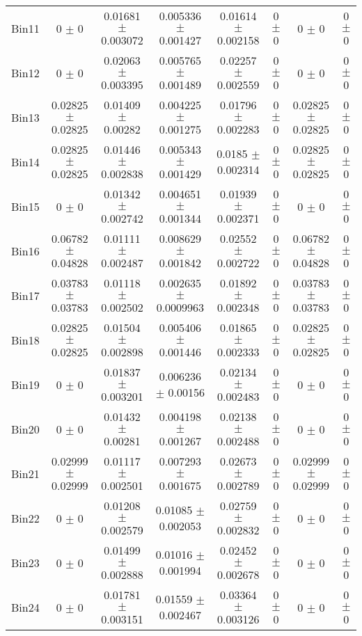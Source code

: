 \begin{tabular}{@{\extracolsep{4pt}}lccccccc@{}}
     Bin11 & 0 $\pm$ 0 & 0.01681 $\pm$ 0.003072 & 0.005336 $\pm$ 0.001427 & 0.01614 $\pm$ 0.002158 & 0 $\pm$ 0 & 0 $\pm$ 0 & 0 $\pm$ 0 \\ 
     Bin12 & 0 $\pm$ 0 & 0.02063 $\pm$ 0.003395 & 0.005765 $\pm$ 0.001489 & 0.02257 $\pm$ 0.002559 & 0 $\pm$ 0 & 0 $\pm$ 0 & 0 $\pm$ 0 \\ 
     Bin13 & 0.02825 $\pm$ 0.02825 & 0.01409 $\pm$ 0.00282 & 0.004225 $\pm$ 0.001275 & 0.01796 $\pm$ 0.002283 & 0 $\pm$ 0 & 0.02825 $\pm$ 0.02825 & 0 $\pm$ 0 \\ 
     Bin14 & 0.02825 $\pm$ 0.02825 & 0.01446 $\pm$ 0.002838 & 0.005343 $\pm$ 0.001429 & 0.0185 $\pm$ 0.002314 & 0 $\pm$ 0 & 0.02825 $\pm$ 0.02825 & 0 $\pm$ 0 \\ 
     Bin15 & 0 $\pm$ 0 & 0.01342 $\pm$ 0.002742 & 0.004651 $\pm$ 0.001344 & 0.01939 $\pm$ 0.002371 & 0 $\pm$ 0 & 0 $\pm$ 0 & 0 $\pm$ 0 \\ 
     Bin16 & 0.06782 $\pm$ 0.04828 & 0.01111 $\pm$ 0.002487 & 0.008629 $\pm$ 0.001842 & 0.02552 $\pm$ 0.002722 & 0 $\pm$ 0 & 0.06782 $\pm$ 0.04828 & 0 $\pm$ 0 \\ 
     Bin17 & 0.03783 $\pm$ 0.03783 & 0.01118 $\pm$ 0.002502 & 0.002635 $\pm$ 0.0009963 & 0.01892 $\pm$ 0.002348 & 0 $\pm$ 0 & 0.03783 $\pm$ 0.03783 & 0 $\pm$ 0 \\ 
     Bin18 & 0.02825 $\pm$ 0.02825 & 0.01504 $\pm$ 0.002898 & 0.005406 $\pm$ 0.001446 & 0.01865 $\pm$ 0.002333 & 0 $\pm$ 0 & 0.02825 $\pm$ 0.02825 & 0 $\pm$ 0 \\ 
     Bin19 & 0 $\pm$ 0 & 0.01837 $\pm$ 0.003201 & 0.006236 $\pm$ 0.00156 & 0.02134 $\pm$ 0.002483 & 0 $\pm$ 0 & 0 $\pm$ 0 & 0 $\pm$ 0 \\ 
     Bin20 & 0 $\pm$ 0 & 0.01432 $\pm$ 0.00281 & 0.004198 $\pm$ 0.001267 & 0.02138 $\pm$ 0.002488 & 0 $\pm$ 0 & 0 $\pm$ 0 & 0 $\pm$ 0 \\ 
     Bin21 & 0.02999 $\pm$ 0.02999 & 0.01117 $\pm$ 0.002501 & 0.007293 $\pm$ 0.001675 & 0.02673 $\pm$ 0.002789 & 0 $\pm$ 0 & 0.02999 $\pm$ 0.02999 & 0 $\pm$ 0 \\ 
     Bin22 & 0 $\pm$ 0 & 0.01208 $\pm$ 0.002579 & 0.01085 $\pm$ 0.002053 & 0.02759 $\pm$ 0.002832 & 0 $\pm$ 0 & 0 $\pm$ 0 & 0 $\pm$ 0 \\ 
     Bin23 & 0 $\pm$ 0 & 0.01499 $\pm$ 0.002888 & 0.01016 $\pm$ 0.001994 & 0.02452 $\pm$ 0.002678 & 0 $\pm$ 0 & 0 $\pm$ 0 & 0 $\pm$ 0 \\ 
     Bin24 & 0 $\pm$ 0 & 0.01781 $\pm$ 0.003151 & 0.01559 $\pm$ 0.002467 & 0.03364 $\pm$ 0.003126 & 0 $\pm$ 0 & 0 $\pm$ 0 & 0 $\pm$ 0 \\ 

\end{tabular}
